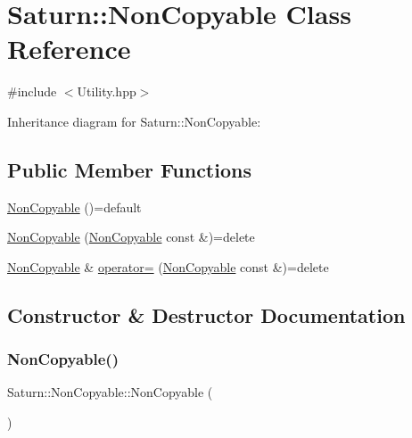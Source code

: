 \hypertarget{class_saturn_1_1_non_copyable}{}\section{Saturn\+:\+:Non\+Copyable Class Reference}
\label{class_saturn_1_1_non_copyable}


{\ttfamily \#include $<$Utility.\+hpp$>$}



Inheritance diagram for Saturn\+:\+:Non\+Copyable\+:
\subsection*{Public Member Functions}
\begin{DoxyCompactItemize}
\item 
\mbox{\hyperlink{class_saturn_1_1_non_copyable_a5721e413a36edd295bad3b4809d8f376}{Non\+Copyable}} ()=default
\item 
\mbox{\hyperlink{class_saturn_1_1_non_copyable_aeddf6ec26a7dc9943513a8d8a4d587e6}{Non\+Copyable}} (\mbox{\hyperlink{class_saturn_1_1_non_copyable}{Non\+Copyable}} const \&)=delete
\item 
\mbox{\hyperlink{class_saturn_1_1_non_copyable}{Non\+Copyable}} \& \mbox{\hyperlink{class_saturn_1_1_non_copyable_ada58c0a0bab59bc988a493ec5ecae0d3}{operator=}} (\mbox{\hyperlink{class_saturn_1_1_non_copyable}{Non\+Copyable}} const \&)=delete
\end{DoxyCompactItemize}


\subsection{Constructor \& Destructor Documentation}
\mbox{\label{class_saturn_1_1_non_copyable_a5721e413a36edd295bad3b4809d8f376}} 
\subsubsection{\texorpdfstring{Non\+Copyable()}{NonCopyable()}\hspace{0.1cm}{\footnotesize\ttfamily [1/2]}}
{\footnotesize\ttfamily Saturn\+::\+Non\+Copyable\+::\+Non\+Copyable (\begin{DoxyParamCaption}{ }\end{DoxyParamCaption})\hspace{0.3cm}{\ttfamily [default]}}

